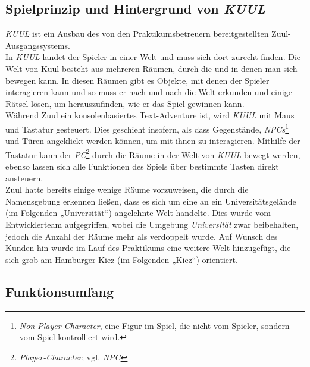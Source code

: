 \documentclass[12pt,twoside]{article}
\theoremstyle{plain}
\theoremstyle{definition}
\theoremstyle{remark}
\begin{document}
%
%

\subsection{Spielprinzip und Hintergrund von \textit{KUUL}}
\label{ssec:main_kuul}
\textit{KUUL} ist ein Ausbau des von den Praktikumsbetreuern bereitgestellten Zuul-Ausgangssystems.
\\
In \textit{KUUL} landet der Spieler in einer Welt und muss sich dort zurecht finden. Die Welt von Kuul besteht aus mehreren Räumen, durch die und in denen man sich bewegen kann. In diesen Räumen gibt es Objekte, mit denen der Spieler interagieren kann und so muss er nach und nach die Welt erkunden und einige Rätsel lösen, um herauszufinden, wie er das Spiel gewinnen kann.
\\
Während Zuul ein konsolenbasiertes Text-Adventure ist, wird \textit{KUUL} mit Maus und Tastatur gesteuert.
Dies geschieht insofern, als dass Gegenstände, \textit{NPCs}\footnote{\textit{Non-Player-Character}, eine Figur im Spiel, die nicht vom Spieler, sondern vom Spiel kontrolliert wird.} und Türen angeklickt werden können, um mit ihnen zu interagieren.
Mithilfe der Tastatur kann der \textit{PC}\footnote{\textit{Player-Character}, vgl. \textit{NPC}} durch die Räume in der Welt von \textit{KUUL} bewegt werden, ebenso lassen sich alle Funktionen des Spiels über bestimmte Tasten direkt ansteuern.\\
Zuul hatte bereits einige wenige Räume vorzuweisen, die durch die Namensgebung erkennen ließen, dass es sich um eine an ein Universitätsgelände (im Folgenden „Universität“) angelehnte Welt handelte.
Dies wurde vom Entwicklerteam aufgegriffen, wobei die Umgebung \textit{Universität} zwar beibehalten, jedoch die Anzahl der Räume mehr als verdoppelt wurde.
Auf Wunsch des Kunden hin wurde im Lauf des Praktikums eine weitere Welt hinzugefügt, die sich grob am Hamburger Kiez (im Folgenden „Kiez“) orientiert.

%
%

\subsection{Funktionsumfang}
\end{document}
